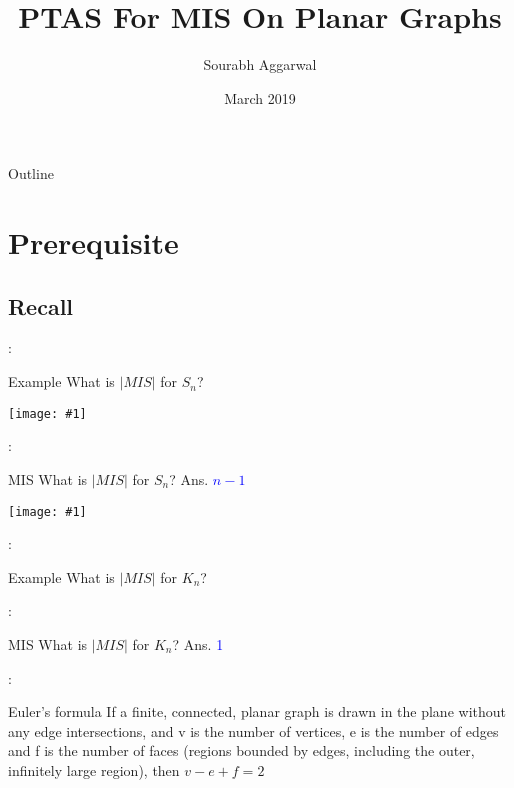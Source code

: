 \documentclass{beamer}
\title{PTAS For MIS On Planar Graphs}
\author{Sourabh Aggarwal}
\institute[IIT Palakkad] %
{
  Department of Computer Science And Engineering\\
  IIT Palakkad
}
\date{March 2019}
\newcommand{\ph}[1]{
    \texttt{[image: \#1]}
}
\begin{document}
\begin{frame}
  \titlepage
\end{frame}

\begin{frame}{Outline}
  \tableofcontents
\end{frame}

\section{Prerequisite}
\subsection{Recall}

\begin{frame}{\secname : \subsecname}
\begin{block}{Example}
    What is $|MIS|$ for $S_n$?

    \vspace{2\baselineskip}
    \ph{sn}
\end{block}
\end{frame}


\begin{frame}{\secname : \subsecname}
\begin{block}{MIS}
    What is $|MIS|$ for $S_n$? Ans. \textcolor{blue}{$n - 1$}

    \vspace{2\baselineskip}
    \ph{sn}

\end{block}
\end{frame}



\begin{frame}{\secname : \subsecname}
\begin{block}{Example}
    What is $|MIS|$ for $K_n$?
\end{block}
\end{frame}


\begin{frame}{\secname : \subsecname}
\begin{block}{MIS}
    What is $|MIS|$ for $K_n$? Ans. \textcolor{blue}{1}
\end{block}
\end{frame}


\begin{frame}{\secname : \subsecname}
\begin{block}{Euler's formula}
    If a finite, connected, planar graph is drawn in the plane without any edge intersections, and v is the number of vertices, e is the number of edges and f is the number of faces (regions bounded by edges, including the outer, infinitely large region), then
    $v - e + f = 2$
\end{block}
\end{frame}
\end{document}
